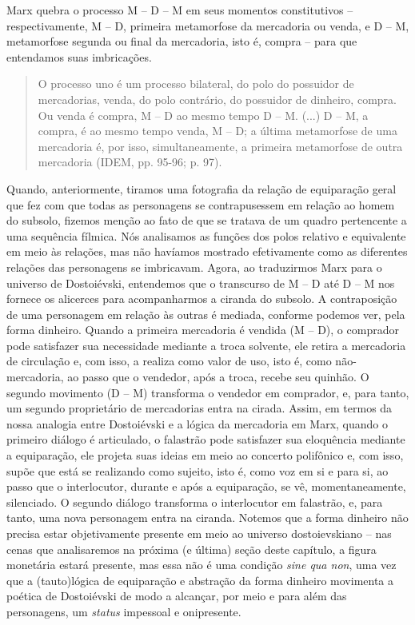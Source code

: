 Marx quebra o processo M -- D -- M em seus momentos constitutivos --
respectivamente, M -- D, primeira metamorfose da mercadoria ou venda, e
D -- M, metamorfose segunda ou final da mercadoria, isto é, compra --
para que entendamos suas imbricações.

\begin{quote}
O processo uno é um processo bilateral, do polo do possuidor de
mercadorias, venda, do polo contrário, do possuidor de dinheiro, compra.
Ou venda é compra, M -- D ao mesmo tempo D -- M. (...) D -- M, a compra,
é ao mesmo tempo venda, M -- D; a última metamorfose de uma mercadoria
é, por isso, simultaneamente, a primeira metamorfose de outra mercadoria
(IDEM, pp. 95-96; p. 97).
\end{quote}

Quando, anteriormente, tiramos uma fotografia da relação de equiparação
geral que fez com que todas as personagens se contrapusessem em relação
ao homem do subsolo, fizemos menção ao fato de que se tratava de um
quadro pertencente a uma sequência fílmica. Nós analisamos as funções
dos polos relativo e equivalente em meio às relações, mas não havíamos
mostrado efetivamente como as diferentes relações das personagens se
imbricavam. Agora, ao traduzirmos Marx para o universo de Dostoiévski,
entendemos que o transcurso de M -- D até D -- M nos fornece os
alicerces para acompanharmos a ciranda do subsolo. A contraposição de
uma personagem em relação às outras é mediada, conforme podemos ver,
pela forma dinheiro. Quando a primeira mercadoria é vendida (M -- D), o
comprador pode satisfazer sua necessidade mediante a troca solvente, ele
retira a mercadoria de circulação e, com isso, a realiza como valor de
uso, isto é, como não-mercadoria, ao passo que o vendedor, após a troca,
recebe seu quinhão. O segundo movimento (D -- M) transforma o vendedor
em comprador, e, para tanto, um segundo proprietário de mercadorias
entra na cirada. Assim, em termos da nossa analogia entre Dostoiévski e
a lógica da mercadoria em Marx, quando o primeiro diálogo é articulado,
o falastrão pode satisfazer sua eloquência mediante a equiparação, ele
projeta suas ideias em meio ao concerto polifônico e, com isso, supõe
que está se realizando como sujeito, isto é, como voz em si e para si,
ao passo que o interlocutor, durante e após a equiparação, se vê,
momentaneamente, silenciado. O segundo diálogo transforma o interlocutor
em falastrão, e, para tanto, uma nova personagem entra na ciranda.
Notemos que a forma dinheiro não precisa estar objetivamente presente em
meio ao universo dostoievskiano -- nas cenas que analisaremos na próxima
(e última) seção deste capítulo, a figura monetária estará presente, mas
essa não é uma condição \emph{sine qua non}, uma vez que a (tauto)lógica
de equiparação e abstração da forma dinheiro movimenta a poética de
Dostoiévski de modo a alcançar, por meio e para além das personagens, um
\emph{status} impessoal e onipresente.

